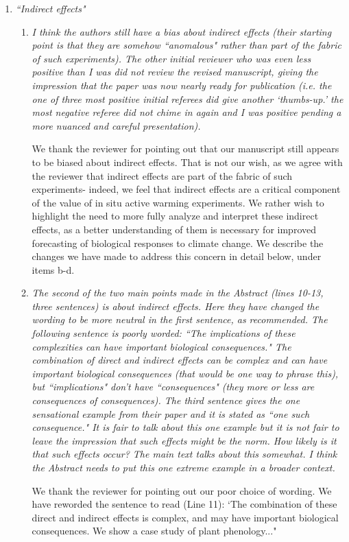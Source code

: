 \documentclass[11pt,a4paper]{letter}
\begin{document}
\begin{letter}{}
\begin{enumerate}
\begin{enumerate}
\end{enumerate}
\item \emph{``Indirect effects"}
\begin{enumerate}
\item \emph{ I think the authors still have a bias about indirect effects (their starting
point is that they are somehow ``anomalous" rather than part of the
fabric of such experiments). The other initial reviewer who was even
less positive than I was did not review the revised manuscript, giving the
impression that the paper was now nearly ready for publication (i.e. the
one of three most positive initial referees did give another `thumbs-up.'
the most negative referee did not chime in again and I was positive
pending a more nuanced and careful presentation).}
\par We thank the reviewer for pointing out that our manuscript still appears to be biased about indirect effects. That is not our wish, as we agree with the reviewer that indirect effects are part of the fabric of such experiments- indeed, we feel that indirect effects are a critical component of the value of in situ active  warming experiments. 
We rather wish to highlight the need to more fully analyze and interpret these indirect effects, as a better understanding of them is necessary for improved forecasting of biological responses to climate change. We describe the changes we have made to address this concern in detail below, under items b-d.
\item \emph{The second of the two main points made in the Abstract (lines 10-13,
three sentences) is about indirect effects. Here they have changed the
wording to be more neutral in the first sentence, as recommended. The
following sentence is poorly worded: ``The implications of these
complexities can have important biological consequences." The
combination of direct and indirect effects can be complex and can have
important biological consequences (that would be one way to phrase
this), but ``implications" don't have ``consequences" (they more or less
are consequences of consequences). The third sentence gives the one
sensational example from their paper and it is stated as ``one such
consequence." It is fair to talk about this one example but it is not fair to
leave the impression that such effects might be the norm. How likely is
it that such effects occur? The main text talks about this somewhat. I
think the Abstract needs to put this one extreme example in a broader
context.}
\par We thank the reviewer for pointing out our poor choice of wording. We have reworded the sentence to read (Line 11): `The combination of these direct and indirect effects is complex, and may have important biological consequences. We show a case study of plant phenology..."

\end{enumerate}
\end{enumerate}
\end{letter}
\end{document}
